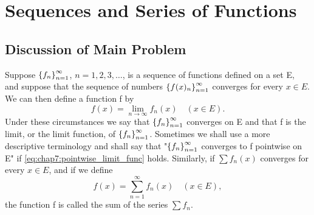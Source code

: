 
\chapter{Sequences and Series of Functions}
\label{chap:rudin7}


\section{Discussion of Main Problem}
\label{sec:chap7:main_problem}

\begin{definition} %
  \label{def:chap7:pointwise_convergence}
  Suppose $\left\{ f_n \right\}_{n=1}^\infty$, $n=1, 2, 3, \dots$, is a sequence of
  functions defined on a set E, and suppose that the sequence of
  numbers $\left\{ f(x)_n \right\}_{n=1}^\infty$ converges for every $x \in E$. We can
  then define a function f by
  \begin{equation} \label{eq:chap7:pointwise_limit_func}
    f(x) = \lim_{n \to \infty} f_n(x) \quad (x \in E).
  \end{equation}
  Under these circumstances we say that $\left\{ f_n \right\}_{n=1}^\infty$ converges on E
  and that f is the limit, or the limit function, of $\left\{ f_n \right\}_{n=1}^\infty$.
  Sometimes we shall use a more descriptive terminology and shall say
  that "$\left\{ f_n \right\}_{n=1}^\infty$ converges to f pointwise on E" if
  \eqref{eq:chap7:pointwise_limit_func} holds.
  Similarly, if $\sum f_n(x)$ converges for every $x \in E$, and if we define
  \begin{equation} \label{eq:chap7:pointwise_limit_series}
    f(x) = \sum_{n=1}^\infty f_n(x) \quad (x \in E),
  \end{equation}
  the function f is called the sum of the series $\sum f_n$.
\end{definition}

